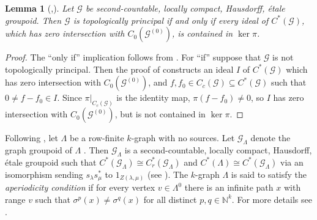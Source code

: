 \documentclass[a4paper, 12pt]{amsart}
\numberwithin{equation}{section}
\newcounter{theorem}
\newtheorem{lemma}[theorem]{Lemma}
\theoremstyle{remark}
\theoremstyle{definition}
\begin{document}
\begin{lemma}[{\cite[Proposition~5.5]{MR3189105},\cite[Theorem~2]{MR1258035}}]
\label{lem.top.free} Let ${\mathcal{G}}$ be second-countable, locally compact, Hausdorff, \'etale
groupoid.  Then ${\mathcal{G}}$ is topologically principal  if and  only if every  ideal of
$C^*({\mathcal{G}})$, which  has  zero intersection with  $C_0({\mathcal{G}}^{(0)})$, is contained in
$\ker\pi$.
\end{lemma}

\begin{proof}
The ``only if'' implication follows from \cite[Proposition~5.5(1)]{MR3189105}. For ``if'' suppose that ${\mathcal{G}}$ is not topologically principal. Then the proof of
\cite[Proposition~5.5(2)]{MR3189105} constructs an ideal $I$ of $C^*({\mathcal{G}})$ which has zero
intersection with $C_0({\mathcal{G}}^{(0)})$, and $f,f_0\in C_c({\mathcal{G}})\subseteq C^*({\mathcal{G}})$ such that $0\neq f-f_0\in I$.
Since $\pi|_{C_c({\mathcal{G}})}$ is the identity map, $\pi(f-f_0)\neq 0$, so $I$ has zero intersection with
$C_0({\mathcal{G}}^{(0)})$, but is not contained in $\ker\pi$.
\end{proof}

Following \cite{MR1745529}, let $\Lambda$ be a row-finite $k$-graph with no sources. Let
${\mathcal{G}}_\Lambda$ denote the graph groupoid of $\Lambda$ \cite[Definition 2.7]{MR1745529}.
Then ${\mathcal{G}}_\Lambda$ is a second-countable, locally compact, Hausdorff, \'etale groupoid such that
$C^*({\mathcal{G}}_\Lambda)\cong C^*_r({\mathcal{G}}_\Lambda)$ and $C^*(\Lambda)\cong C^*({\mathcal{G}}_\Lambda)$ via
an isomorphism sending $s_\lambda s_\mu^*$ to $1_{Z(\lambda,\mu)}$ (see \cite[Corollary
3.5]{MR1745529}). The $k$-graph $\Lambda$ is said to satisfy the \emph{aperiodicity
condition} if for every vertex $v \in \Lambda^0$ there is an infinite path $x$ with range
$v$ such that $\sigma^p(x)\neq \sigma^q(x)$ for all distinct $p,q\in {\mathbb{N}}^k$. For more
details see \cite{MR1745529}.
\end{document}
